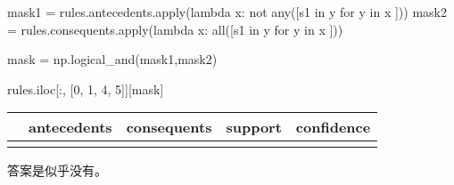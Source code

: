 \documentclass[
  letterpaper,
  DIV=11,
  numbers=noendperiod]{scrreprt}
\newenvironment{Shaded}{\begin{snugshade}}{\end{snugshade}}
\newcommand{\BuiltInTok}[1]{\textcolor[rgb]{0.00,0.23,0.31}{#1}}
\newcommand{\ControlFlowTok}[1]{\textcolor[rgb]{0.00,0.23,0.31}{#1}}
\newcommand{\DecValTok}[1]{\textcolor[rgb]{0.68,0.00,0.00}{#1}}
\newcommand{\KeywordTok}[1]{\textcolor[rgb]{0.00,0.23,0.31}{#1}}
\newcommand{\NormalTok}[1]{\textcolor[rgb]{0.00,0.23,0.31}{#1}}
\newcommand{\OperatorTok}[1]{\textcolor[rgb]{0.37,0.37,0.37}{#1}}
\newcommand{\StringTok}[1]{\textcolor[rgb]{0.13,0.47,0.30}{#1}}
\begin{document}
\begin{Shaded}
\begin{Highlighting}[]
\NormalTok{mask1 }\OperatorTok{=}\NormalTok{ rules.antecedents.}\BuiltInTok{apply}\NormalTok{(}\KeywordTok{lambda}\NormalTok{ x: }\KeywordTok{not} \BuiltInTok{any}\NormalTok{([}\StringTok{\textquotesingle{}s1\textquotesingle{}} \KeywordTok{in}\NormalTok{ y }\ControlFlowTok{for}\NormalTok{ y }\KeywordTok{in}\NormalTok{ x ]))}
\NormalTok{mask2 }\OperatorTok{=}\NormalTok{ rules.consequents.}\BuiltInTok{apply}\NormalTok{(}\KeywordTok{lambda}\NormalTok{ x: }\BuiltInTok{all}\NormalTok{([}\StringTok{\textquotesingle{}s1\textquotesingle{}} \KeywordTok{in}\NormalTok{ y }\ControlFlowTok{for}\NormalTok{ y }\KeywordTok{in}\NormalTok{ x ]))}

\NormalTok{mask }\OperatorTok{=}\NormalTok{ np.logical\_and(mask1,mask2)}

\NormalTok{rules.iloc[:, [}\DecValTok{0}\NormalTok{, }\DecValTok{1}\NormalTok{, }\DecValTok{4}\NormalTok{, }\DecValTok{5}\NormalTok{]][mask]}
\end{Highlighting}
\end{Shaded}

\begin{longtable}[]{@{}lllll@{}}
\toprule\noalign{}
& antecedents & consequents & support & confidence \\
\midrule\noalign{}
\endhead
\bottomrule\noalign{}
\endlastfoot
\end{longtable}

答案是似乎没有。
\end{document}
